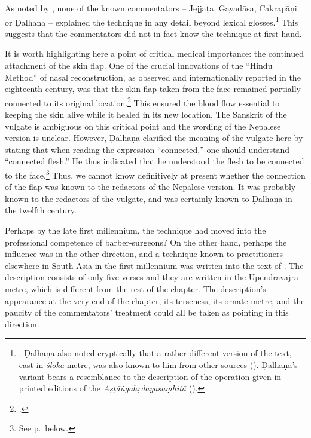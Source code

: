 As noted by \citeauthor{meul-hist}, none of the known commentators -- Jejjaṭa,
Gayadāsa, Cakrapāṇi or Ḍalhaṇa -- explained the technique in any detail beyond
lexical glosses.\footnote{\cite[IB, 328]{meul-hist}. Ḍalhaṇa also noted
cryptically that a rather different version of the text, cast in \emph{śloka}
metre, was also known to him from other sources (). 
Ḍalhaṇa's variant bears a resemblance to the description of the operation given in
printed editions of the \emph{Aṣṭāṅgahṛdayasaṃhitā} 
().}
This suggests that the commentators did not in fact know the technique at
first-hand.

It is worth highlighting here a point of critical medical importance: the continued
attachment of the skin flap. One of the crucial innovations of the “Hindu Method”
of nasal reconstruction, as observed  and internationally reported in the
eighteenth century, was that the skin flap taken from the face remained partially
connected to its original location.\footcite[See][67--70]{wuja-2003}  This ensured
the blood flow essential to keeping the skin alive while it healed in its new
location. The Sanskrit of the vulgate is ambiguous on this critical point and the
wording of the Nepalese version is unclear. However, Ḍalhaṇa \citep[81]{vulgate}
clarified the meaning of the vulgate here by stating that when reading the
expression “connected,” one should understand “connected flesh.”  He thus
indicated that he understood the flesh to be connected to the face.\footnote{See
p.\,\pageref{well-joined} below.}   Thus, we cannot know definitively at present
whether the connection of the flap was known to the redactors of the Nepalese
version.  It was probably known to the redactors of the vulgate, and was certainly
known to Ḍalhaṇa in the twelfth century.



Perhaps by the late first millennium, the technique had moved into the
professional competence of barber-surgeons?  On the other hand, perhaps the
influence was in the other direction, and a technique known to practitioners
elsewhere in South Asia in the first millennium was written into the text of
\SS. The description consists of only five verses and they are written in the
Upendravajrā metre, which is different from the rest of the chapter.  The
description's appearance at the very end of the chapter, its terseness, its ornate
metre, and the paucity of the commentators' treatment could all be taken as
pointing in this direction.

